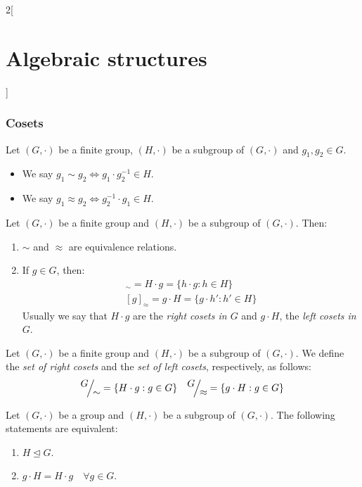 \documentclass[../../../main.tex]{subfiles}
\begin{document}
\begin{multicols}{2}[\section{Algebraic structures}]
    \subsubsection{Cosets}
    \begin{definition}\label{AS_equiv}
        Let $(G,\cdot)$ be a finite group, $(H,\cdot)$ be a subgroup of $(G,\cdot)$ and $g_1,g_2\in G$.
        \begin{itemize}
            \item We say $g_1\sim g_2\iff g_1\cdot g_2^{-1}\in H$.
            \item We say $g_1\approx g_2\iff g_2^{-1}\cdot g_1\in H$.
        \end{itemize}
    \end{definition}
    \begin{lemma}
        Let $(G,\cdot)$ be a finite group and $(H,\cdot)$ be a subgroup of $(G,\cdot)$. Then:
        \begin{enumerate}
            \item $\sim$ and $\approx$ are equivalence relations.
            \item If $g\in G$, then:
                  \begin{gather*}
                      [g]_\sim=H\cdot g=\{h\cdot g:h\in H\}\\ [g]_\approx=g\cdot H=\{g\cdot h':h'\in H\}
                  \end{gather*}
                  Usually we say that $H\cdot g$ are the \textit{right cosets in $G$} and $g\cdot H$, the \textit{left cosets in $G$}.
        \end{enumerate}
    \end{lemma}
    \begin{definition}
        Let $(G,\cdot)$ be a finite group and $(H,\cdot)$ be a subgroup of $(G,\cdot)$. We define the \textit{set of right cosets} and the \textit{set of left cosets}, respectively, as follows:
        $$\quot{G}{\sim}=\{H\cdot g:g\in G\}\quad\quot{G}{\approx}=\{g\cdot H:g\in G\}$$
    \end{definition}
    \begin{prop}
        Let $(G,\cdot)$ be a group and $(H,\cdot)$ be a subgroup of $(G,\cdot)$. The following statements are equivalent:
        \begin{enumerate}
            \item $H\unlhd G$.
            \item $g\cdot H=H\cdot g\quad\forall g\in G$.
        \end{enumerate}

\end{prop}
\end{multicols}
\end{document}
